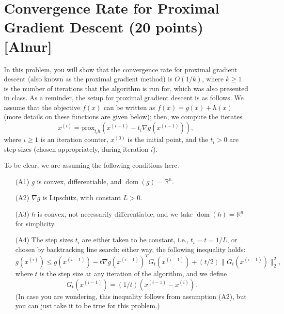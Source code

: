 \documentclass{article}
\theoremstyle{remark}
\theoremstyle{definition}
\newcommand{\reals}{\mathbb R}
\newcommand{\dom}{\operatorname{dom}}
\begin{document}
\section{Convergence Rate for Proximal Gradient Descent (20 points) [Alnur]}
In this problem, you will show that the convergence rate for proximal gradient descent (also known as the proximal gradient method) is $O(1/k)$, where $k \geq 1$ is the number of iterations that the algorithm is run for, which was also presented in class.  As a reminder, the setup for proximal gradient descent is as follows.  We assume that the objective $f(x)$ can be written as $f(x) = g(x) + h(x)$ (more details on these functions are given below); then, we compute the iterates
\begin{equation}
x^{(i)} = \textrm{prox}_{t_i h} \left( x^{(i-1)} - t_i \nabla g(x^{(i-1)}) \right), \label{eq:q3:1}
\end{equation}
where $i \geq 1$ is an iteration counter, $x^{(0)}$ is the initial point, and the $t_i > 0$ are step sizes (chosen appropriately, during iteration $i$).

To be clear, we are assuming the following conditions here.
\begin{enumerate}
\item[(A1)] $g$ is convex, differentiable, and $\dom(g) = \reals^n$.
\item[(A2)] $\nabla g$ is Lipschitz, with constant $L > 0$.
\item[(A3)] $h$ is convex, not necessarily differentiable, and we take $\dom(h) = \reals^n$ for simplicity.
\item[(A4)] The step sizes $t_i$ are either taken to be constant, i.e., $t_i = t = 1 / L$, or chosen by backtracking line search; either way, the following inequality holds:
\begin{equation}
g(x^{(i)}) \leq g(x^{(i-1)}) - t \nabla g(x^{(i-1)})^T G_{t}(x^{(i-1)}) + (t / 2) \| G_{t}(x^{(i-1)}) \|_2^2, \label{eq:q3:2}
\end{equation}
where $t$ is the step size at any iteration of the algorithm, and we define 
\[
G_{t}(x^{(i-1)}) = (1/t) \left( x^{(i-1)} - x^{(i)} \right).
\]
(In case you are wondering, this inequality follows from assumption (A2), but you can just take it to be true for this problem.)
\end{enumerate}
\end{document}
